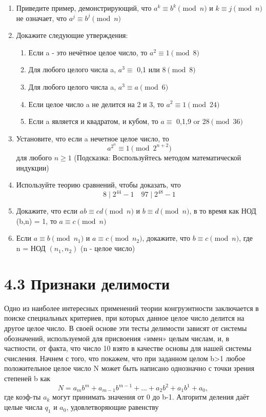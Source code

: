 \documentclass[11pt]{article}
\begin{document}
\begin{enumerate}
\thispagestyle{fancy}
\rhead{\thepage}
\item Приведите пример, демонстрирующий, что $a^{k}\equiv b^{k} \pmod {n}$ и $k\equiv j \pmod {n}$ не означает, что $a^{j}\equiv b^{j} \pmod {n}$
\item Докажите следующие утверждения:
\begin{enumerate}
	\item Если a - это нечётное целое число, то $a^{2}\equiv 1\pmod {8} $
	\item Для любого целого числа a, $a^{3}\equiv$ 0,1 или 8$\pmod {8}$
	\item Для любого целого числа a, $a^{3}\equiv a\pmod {6}$
	\item Если целое число a не делится на 2 и 3, то $a^{2} \equiv 1\pmod {24}$
	\item Если a является и квадратом, и кубом, то  $a \equiv$ 0,1,9 or 28$\pmod {36}$
\end{enumerate}
\item Установите, что если a нечетное целое число, то $$a^{2^{n}}\equiv 1\pmod {2^{n+2}}$$ для любого $n \geq 1$ (Подсказка: Воспользуйтесь методом математической индукции)
\item Используйте теорию сравнений, чтобы доказать, что $$8\mid 2^{44}-1 \quad 97\mid2^{48}-1$$
\item Докажите, что если $ab\equiv cd \pmod {n}$ и $b\equiv d \pmod {n}$, в то время как НОД (b,n) = 1, то $a\equiv c \pmod {n}$
\item Если $a\equiv b \pmod {n_1}$ и $a\equiv c \pmod {n_2}$, докажите, что $b\equiv c \pmod {n}$, где \\
n = НОД $(n_1,n_2)$ (n - целое число)
\end{enumerate}

\section* {4.3 Признаки делимости}
Одно из наиболее интересных применений теории конгруэнтности заключается в поиске специальных критериев, при которых данное целое число делится на другое целое число. В своей основе эти тесты делимости зависят от системы обозначений, используемой для присвоения «имен» целым числам, и, в частности, от факта, что число 10 взято в качестве основы для нашей системы счисления. Начнем с того, что покажем, что при заданном целом b>1 любое положительное целое число N может быть написано однозначно с точки зрения степеней b как
$$N = a_mb^{m} + a_{m-1}b^{m-1} + ... + a_{2}b^{2} + a_{1}b^{1} + a_{0},$$ где коэф-ты $a_{k}$ могут принимать значения от 0 до b-1. Алгоритм деления даёт целые числа $q_{1}$ и $a_{0}$, удовлетворяющие равенству 
\end{document}
